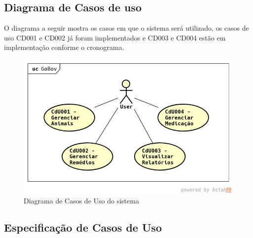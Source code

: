 \documentclass[12pt]{article}
\begin{document}
\begin{titlepage}
\begin{center}
\subsection{Diagrama de Casos de uso}

O diagrama a seguir mostra os casos em que o sistema será utilizado, os casos de uso CD001 e CD002 já foram implementados e CD003 e CD004 estão em implementação conforme o cronograma.

\begin{figure}[!h]
	\begin{center}
		\caption{Diagrama de Casos de Uso do sistema}
		\includegraphics[width=6in]{img/casosdeuso.png}

	\end{center}
\end{figure}

\newpage

\subsection{Especificação de Casos de Uso}


\end{center}
\end{titlepage}
\end{document}
